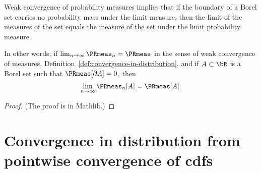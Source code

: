 \begin{lemma}
  \label{lem:portmanteau-convergence-for-borel}
  \leanok
  \mathlibok
  Weak convergence of probability measures implies that if the boundary of a Borel set carries
  no probability mass under the limit measure, then the limit of the measures of the set equals
  the measure of the set under the limit probability measure.

  In other words, if $\lim_{n \to \infty} \PRmeas_n = \PRmeas$ in the sense of weak convergence
  of measures, Definition~\ref{def:convergence-in-distribution}, and if $A \subset \bR$
  is a Borel set such that $\PRmeas[\partial A] = 0$, then
  \begin{align*}
    \lim_{n \to \infty} \PRmeas_n [ A ] = \PRmeas [ A ] .
  \end{align*}
\end{lemma}
\begin{proof}
  \leanok
  \mathlibok
  (The proof is in Mathlib.)
\end{proof}

\section{Convergence in distribution from pointwise convergence of cdfs}

